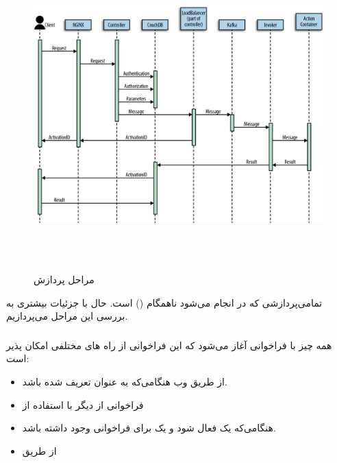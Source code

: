 \begin{figure}[!h]
	\centering
	\includegraphics[height=12cm]{Images/action_invokation_timeline}
	\caption{مراحل پردازش }
	\label{تصویر 2-1}
\end{figure}

تمامی‌پردازشی که در  انجام می‌شود ناهمگام () است. حال با جزئیات بیشتری به بررسی این مراحل می‌پردازیم.

\subsubsection*{}

همه چیز با فراخوانی  آغاز می‌شود که این فراخوانی از راه های مختلفی امکان پذیر است:

\begin{itemize}

	\item از طریق وب هنگامی‌که  به عنوان  تعریف شده باشد.
	
	\item فراخوانی از  دیگر با استفاده از 
	
	\item هنگامی‌که یک  فعال شود و یک  برای فراخوانی  وجود داشته باشد.
	
	\item از طریق 
	
\end{itemize}

